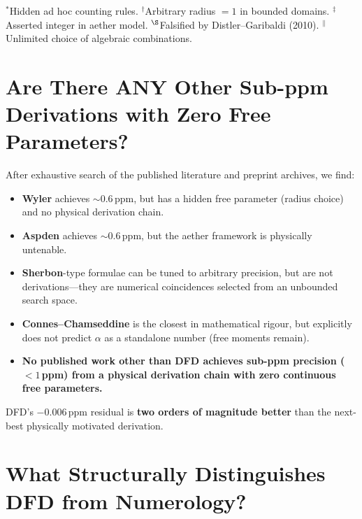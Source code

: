 \documentclass[11pt,a4paper]{article}
\begin{document}
\noindent
{\footnotesize
$^*$Hidden ad hoc counting rules. \quad
$^\dagger$Arbitrary radius $=1$ in bounded domains. \quad
$^\ddagger$Asserted integer in aether model. \quad
$^\S$Falsified by Distler--Garibaldi (2010). \quad
$^\|$Unlimited choice of algebraic combinations.
}

\section{Are There ANY Other Sub-ppm Derivations with Zero Free Parameters?}
\label{sec:uniqueness}

\begin{tcolorbox}[colback=red!5!white, colframe=red!50!black, title=Answer: No.]
After exhaustive search of the published literature and preprint archives, we find:
\begin{itemize}[nosep]
\item \textbf{Wyler} achieves $\sim 0.6$\,ppm, but has a hidden free parameter (radius choice) and no physical derivation chain.
\item \textbf{Aspden} achieves $\sim 0.6$\,ppm, but the aether framework is physically untenable.
\item \textbf{Sherbon}-type formulae can be tuned to arbitrary precision, but are not derivations---they are numerical coincidences selected from an unbounded search space.
\item \textbf{Connes--Chamseddine} is the closest in mathematical rigour, but explicitly does not predict $\alpha$ as a standalone number (free moments remain).
\item \textbf{No published work other than DFD achieves sub-ppm precision ($<1$\,ppm) from a physical derivation chain with zero continuous free parameters.}
\end{itemize}
DFD's $-0.006$\,ppm residual is \textbf{two orders of magnitude better} than the next-best physically motivated derivation.
\end{tcolorbox}

\section{What Structurally Distinguishes DFD from Numerology?}
\label{sec:not-numerology}
\end{document}
